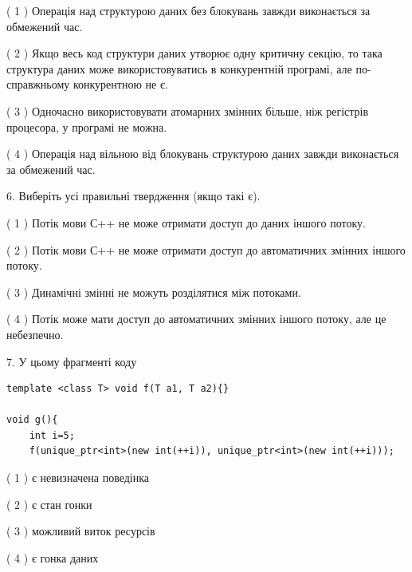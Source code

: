 \documentclass[12pt, ukrainian]{article}
\begin{document}
\begin {large}
{( 1 ) Операція над структурою даних без блокувань завжди виконається за обмежений час.%

( 2 ) Якщо весь код структури даних утворює одну критичну секцію, то така структура даних може використовуватись в конкурентній програмі, але по-справжньо\-му конкурентною не є.%

( 3 ) Одночасно використовувати атомарних змінних більше, ніж регістрів процесора, у програмі не можна.%

( 4 ) Операція над вільною від блокувань структурою даних завжди виконається за обмежений час.%
\newpage



\vspace{5mm}
6. Виберіть усі правильні твердження (якщо такі є).\par
\vspace{2mm}

( 1 ) Потік мови С++ не може отримати доступ до даних іншого потоку.%

( 2 ) Потік мови С++ не може отримати доступ до автоматичних змінних іншого потоку.%

( 3 ) Динамічні змінні не можуть розділятися між потоками.%

( 4 ) Потік може мати доступ до автоматичних змінних іншого потоку, але це небезпечно.%


\vspace{5mm}
7. У цьому фрагменті коду
\begin{verbatim}
template <class T> void f(T a1, T a2){}

void g(){
    int i=5;
    f(unique_ptr<int>(new int(++i)), unique_ptr<int>(new int(++i)));
\end{verbatim}

( 1 ) є невизначена поведінка%

( 2 ) є стан гонки%

( 3 ) можливий виток ресурсів%

( 4 ) є гонка даних%
}
\end {large}
\end{document}
